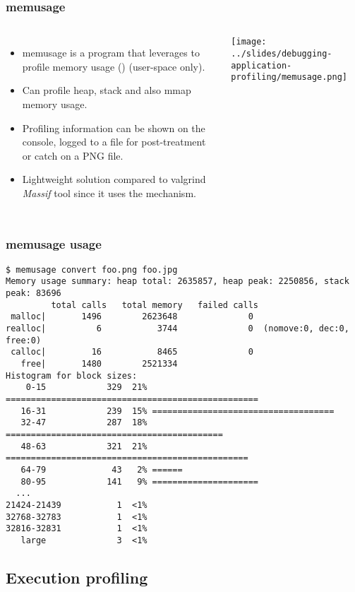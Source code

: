 \begin{frame}[fragile]
  \frametitle{memusage}
  \begin{columns}[T]
    \begin{itemize}
      \item memusage is a program that leverages  to profile
            memory usage () (user-space only).
      \item Can profile heap, stack and also mmap memory usage.
      \item Profiling information can be shown on the console, logged to
        a file for post-treatment or catch on a PNG file.
      \item Lightweight solution compared to valgrind {\em Massif} tool since it
            uses the  mechanism.
    \end{itemize}
    \texttt{[image: ../slides/debugging-application-profiling/memusage.png]}
  \end{columns}
\end{frame}

\begin{frame}[fragile]
  \frametitle{memusage usage}
  \begin{block}{}
    \begin{verbatim}
$ memusage convert foo.png foo.jpg
Memory usage summary: heap total: 2635857, heap peak: 2250856, stack peak: 83696
         total calls   total memory   failed calls
 malloc|       1496        2623648              0
realloc|          6           3744              0  (nomove:0, dec:0, free:0)
 calloc|         16           8465              0
   free|       1480        2521334
Histogram for block sizes:
    0-15            329  21% ==================================================
   16-31            239  15% ====================================
   32-47            287  18% ===========================================
   48-63            321  21% ================================================
   64-79             43   2% ======
   80-95            141   9% =====================
  ...
21424-21439           1  <1% 
32768-32783           1  <1% 
32816-32831           1  <1% 
   large              3  <1% 
    \end{verbatim}
  \end{block}
\end{frame}

\subsection{Execution profiling}

